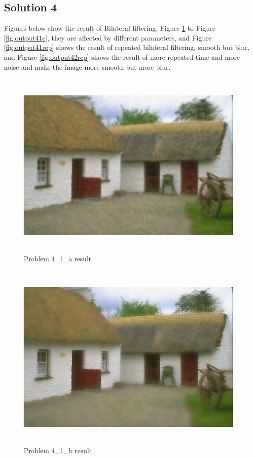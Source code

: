 \documentclass{article}
\newcommand{\solution}[1]{\clearpage \subsection*{Solution #1}}
\begin{document}
\solution{4} Figures below show the result of Bilateral filtering, Figure \ref{fig:output41a} to Figure \ref{fig:output41c}, they are affected by different parameters, and Figure \ref{fig:output41rep} shows the result of repeated bilateral filtering, smooth but blur, and Figure \ref{fig:output42rep} shows the result of more repeated time and more noise and make the image more smooth but more blur.
\begin{figure}[!h]
  \centering
    \includegraphics[height=25em]{code/outputs/prob4_1_a.jpg}
  \caption{Problem 4\_1\_a result}
  \label{fig:output41a}
\end{figure}

\begin{figure}[!h]
  \centering
    \includegraphics[height=25em]{code/outputs/prob4_1_b.jpg}
  \caption{Problem 4\_1\_b result}
  \label{fig:output41b}
\end{figure}
\end{document}
